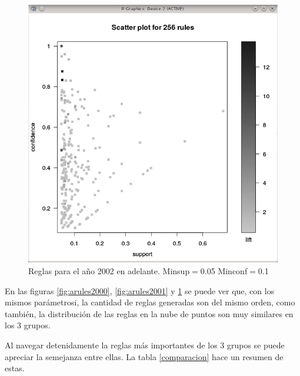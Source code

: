 \documentclass[journal]{IEEEtran}
\begin{document}
\begin{figure}[ht!]
  \caption{Reglas para el año 2001. Minsup$=$0.05 Minconf$=$0.1}\label{fig:arules2001}
\endminipage\hfill
{}%
  \includegraphics[width=\linewidth]{2002.png}
  \caption{Reglas para el año 2002 en adelante. Minsup$=$0.05 Minconf$=$0.1}\label{fig:arules2002}
\endminipage
\end{figure}

En las figuras \ref{fig:arules2000}, \ref{fig:arules2001} y \ref{fig:arules2002} 
se puede ver que, con los mismos parámetrosi, la cantidad de reglas
generadas son del mismo orden, como también, la distribución de las reglas
en la nube de puntos son muy similares en los 3 grupos.

Al navegar detenidamente la reglas más importantes de los 3 grupos 
se puede apreciar la semejanza
entre ellas. La tabla \ref{comparacion} hace un resumen de estas.
\end{document}
